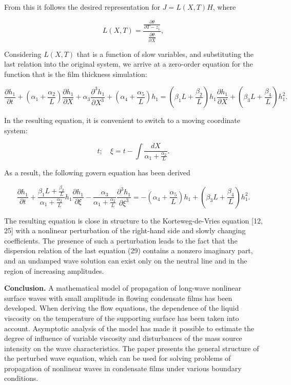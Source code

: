 From this it follows the desired representation for $J=L(X,T)H$, where

\begin{equation}
L(X, T) = \frac{\frac{\partial \theta}{\partial T - z_1}}{\frac{\partial \theta}{\partial X}},
\end{equation}

Considering $L(X,T)$ that is a function of slow variables, and
substituting the last relation into the original system, we arrive at
a zero-order equation for the function that is the film thickness
simulation:

\begin{equation}
\frac{\partial h_1}{\partial t}
+ \left( \alpha_1 + \frac{\alpha_2}{L} \right) \frac{\partial h_1}{\partial X}
+ \alpha_3 \frac{\partial^3 h_1}{\partial X^3}
+ \left( \alpha_4 + \frac{\alpha_5}{L} \right) h_1
=
\left( \beta_1 L + \frac{\beta_2}{L} \right) h_1 \frac{\partial h_1}{\partial X}
+ \left( \beta_3 L + \frac{\beta_4}{L} \right) h_1^2.
\end{equation}

In the resulting equation, it is convenient to switch to a moving
coordinate system:

\begin{equation}
t; \quad \xi = t - \int \frac{dX}{\alpha_1 + \frac{\alpha_2}{L}}.
\end{equation}

As a result, the following govern equation has been derived

\begin{equation}
\frac{\partial h_1}{\partial t}
+ \frac{\beta_1 L + \frac{\beta_2}{L}}{\alpha_1 + \frac{\alpha_2}{L}} h_1 \frac{\partial h_1}{\partial \xi}
- \frac{\alpha_3}{\alpha_1 + \frac{\alpha_2}{L}} \frac{\partial^3 h_1}{\partial \xi^3}
=
- \left( \alpha_4 + \frac{\alpha_5}{L} \right) h_1
+ \left( \beta_3 L + \frac{\beta_4}{L} \right) h_1^2.
\end{equation}

\begin{multicols}{2}
The resulting equation is close in structure to the Korteweg-de-Vries
equation {[}12, 25{]} with a nonlinear perturbation of the right-hand
side and slowly changing coefficients. The presence of such a
perturbation leads to the fact that the dispersion relation of the last
equation (29) contains a nonzero imaginary part, and an undamped wave
solution can exist only on the neutral line and in the region of
increasing amplitudes.

{\bfseries Conclusion.} A mathematical model of propagation of long-wave
nonlinear surface waves with small amplitude in flowing condensate films
has been developed. When deriving the flow equations, the dependence of
the liquid viscosity on the temperature of the supporting surface has
been taken into account. Asymptotic analysis of the model has made it
possible to estimate the degree of influence of variable viscosity and
disturbances of the mass source intensity on the wave characteristics.
The paper presents the general structure of the perturbed wave equation,
which can be used for solving problems of propagation of nonlinear waves
in condensate films under various boundary conditions.
\end{multicols}

